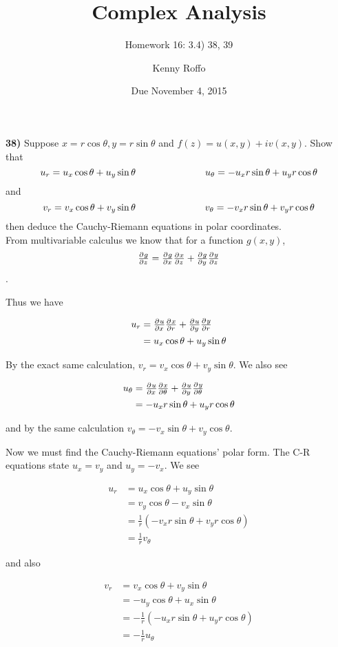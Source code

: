 \documentclass{scrartcl}
\title{Complex Analysis}
\subtitle{Homework 16: 3.4) 38, 39}
\author{Kenny Roffo}
\date{Due November 4, 2015}
\begin{document}
\maketitle

\textbf{38)} Suppose $x=r\cos\theta, y=r\sin\theta$ and $f(z) = u(x,y)+iv(x,y)$. Show that
$$u_r = u_x\cos\theta + u_y\sin\theta \text{\hspace{1in}} u_\theta = -u_xr\sin\theta + u_yr\cos\theta$$ and
$$v_r = v_x\cos\theta + v_y\sin\theta \text{\hspace{1in}} v_\theta = -v_xr\sin\theta + v_yr\cos\theta$$ then deduce the Cauchy-Riemann equations in polar coordinates.\\

From multivariable calculus we know that for a function $g(x,y)$, $$\pd{g}{z} = \pd{g}{x}\pd{x}{z} + \pd{g}{y}\pd{y}{z}$$.

Thus we have

\begin{align*}
  u_r &= \pd{u}{x}\pd{x}{r} + \pd{u}{y}\pd{y}{r}\\
  &= u_x\cos\theta + u_y\sin\theta\\
\end{align*}

By the exact same calculation, $v_r = v_x\cos\theta + v_y\sin\theta$. We also see

\begin{align*}
  u_\theta &= \pd{u}{x}\pd{x}{\theta} + \pd{u}{y}\pd{y}{\theta}\\
  &= -u_xr\sin\theta + u_yr\cos\theta
\end{align*}

and by the same calculation $v_\theta = -v_x\sin\theta + v_y\cos\theta$.

Now we must find the Cauchy-Riemann equations' polar form. The C-R equations state $u_x=v_y$ and $u_y=-v_x$. We see

\begin{align*}
  u_r &= u_x\cos\theta + u_y\sin\theta\\
  &= v_y\cos\theta -v_x\sin\theta\\
  &= \frac{1}{r}\left(-v_xr\sin\theta+v_yr\cos\theta\right)\\
  &= \frac{1}{r}v_\theta
\end{align*}

and also

\begin{align*}
  v_r &= v_x\cos\theta + v_y\sin\theta\\
  &= -u_y\cos\theta + u_x\sin\theta\\
  &= -\frac{1}{r}\left(-u_xr\sin\theta + u_yr\cos\theta\right)\\
  &= -\frac{1}{r}u_\theta
\end{align*}
\end{document}
